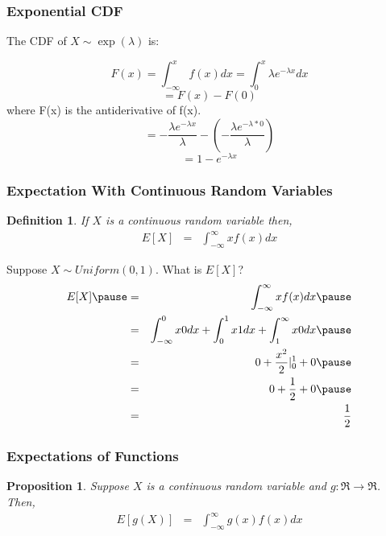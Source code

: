 \documentclass{beamer}
\newtheorem{prop}{Proposition}
\newtheorem{defn}{Definition}
\numberwithin{equation}{section}
\begin{document}
\begin{frame}
\frametitle{Exponential CDF}
The CDF of $X\sim\exp(\lambda)$ is:

$$F(x)= \int_{-\infty}^x f(x)dx=\int_{0}^x \lambda e^{-\lambda x}dx$$\pause
$$= F(x)-F(0)$$\pause
where F(x) is the antiderivative of f(x).\pause
$$= - \frac{\lambda e^{-\lambda x}}{\lambda} - (- \frac{\lambda e^{-\lambda*0}}{\lambda})$$\pause
$$=1-e^{-\lambda x}$$
\end{frame}



\begin{frame}
\frametitle{Expectation With Continuous Random Variables} 

\begin{defn} 
If $X$ is a continuous random variable then, 
\begin{eqnarray}
E[X] & = & \int_{-\infty}^{\infty} x f(x) dx \nonumber 
\end{eqnarray}
\end{defn} 


\end{frame}


\begin{frame}
Suppose $X \sim Uniform(0,1)$.  What is $E[X]$? \pause 
\begin{eqnarray}
E[X] \pause & = & \int_{-\infty}^{\infty} xf(x)dx \nonumber  \pause \\
& = & \int_{-\infty}^{0} x 0 dx + \int_{0}^{1} x 1 dx + \int_{1}^{\infty} x 0 dx \nonumber \pause  \\
& = & 0 +  \frac{x^{2}}{2} |^{1}_{0} + 0 \nonumber  \pause \\
& = & 0 + \frac{1}{2} + 0 \nonumber \pause \\
& = & \frac{1}{2} \nonumber 
\end{eqnarray}


\end{frame}


\begin{frame}
\frametitle{Expectations of Functions} 
\begin{prop} 
Suppose $X$ is a continuous random variable and $g:\Re \rightarrow \Re$.  Then, 
\begin{eqnarray}
E[g(X)] & = & \int_{-\infty}^{\infty} g(x)f(x)dx \nonumber 
\end{eqnarray}
\end{prop} 

\end{frame}
\end{document}
